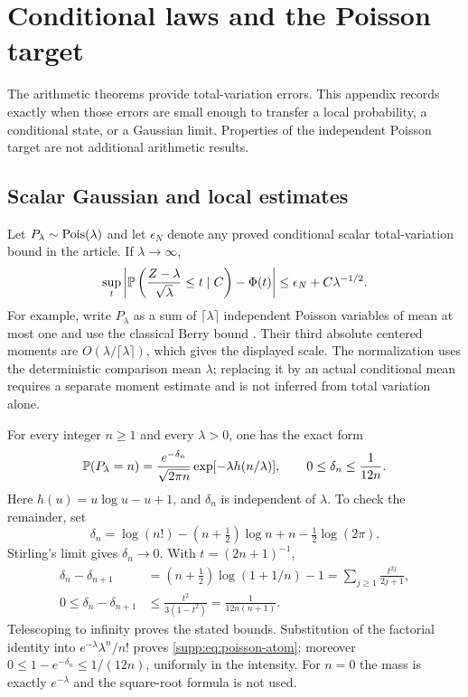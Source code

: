 \section{Conditional laws and the Poisson target}\label{supp:sec:conditional-details}
The arithmetic theorems provide total-variation errors. This appendix
records exactly when those errors are small enough to transfer a local
probability, a conditional state, or a Gaussian limit. Properties of the
independent Poisson target are not additional arithmetic results.

\subsection{Scalar Gaussian and local estimates}
Let $P_\lambda\sim\operatorname{Pois}(\lambda)$ and let $\epsilon_N$ denote any proved
conditional scalar total-variation bound in the article. If $\lambda\to\infty$,
\[
 \sup_t\left|\mathbb P\left(\frac{Z-\lambda}{\sqrt\lambda}\le t\mid C\right)
                       -\Phi(t)\right|
 \le\epsilon_N+C\lambda^{-1/2}.
\]
For example, write $P_\lambda$ as a sum of $\lceil\lambda\rceil$
independent Poisson variables of mean at most one and use the classical
Berry bound \cite{Berry1941}. Their third absolute centered moments
are $O(\lambda/\lceil\lambda\rceil)$, which gives the displayed scale.
The normalization uses the deterministic comparison mean $\lambda$;
replacing it by an actual conditional mean requires a separate moment
estimate and is not inferred from total variation alone.

For every integer $n\ge1$ and every $\lambda>0$, one has the exact form
\begin{equation}\label{supp:eq:poisson-atom}
 \mathbb P(P_\lambda=n)=\frac{e^{-\delta_n}}{\sqrt{2\pi n}}
                    \exp[-\lambda h(n/\lambda)],\qquad
 0\le\delta_n\le\frac1{12n}.
\end{equation}
Here $h(u)=u\log u-u+1$, and $\delta_n$ is independent of $\lambda$. To check the remainder, set
\[
 \delta_n=\log(n!)-(n+\tfrac12)\log n+n-\tfrac12\log(2\pi).
\]
Stirling's limit gives $\delta_n\to0$. With $t=(2n+1)^{-1}$,
\[
 \begin{aligned}
 \delta_n-\delta_{n+1}
 &=(n+\tfrac12)\log(1+1/n)-1
   =\sum_{j\ge1}\frac{t^{2j}}{2j+1},\\
 0\le\delta_n-\delta_{n+1}
 &\le\frac{t^2}{3(1-t^2)}=\frac1{12n(n+1)}.
 \end{aligned}
\]
Telescoping to infinity proves the stated bounds. Substitution of the
factorial identity into $e^{-\lambda}\lambda^n/n!$ proves
\eqref{supp:eq:poisson-atom}; moreover
$0\le1-e^{-\delta_n}\le1/(12n)$, uniformly in the intensity.
For $n=0$ the mass is exactly $e^{-\lambda}$ and the square-root formula
is not used.

